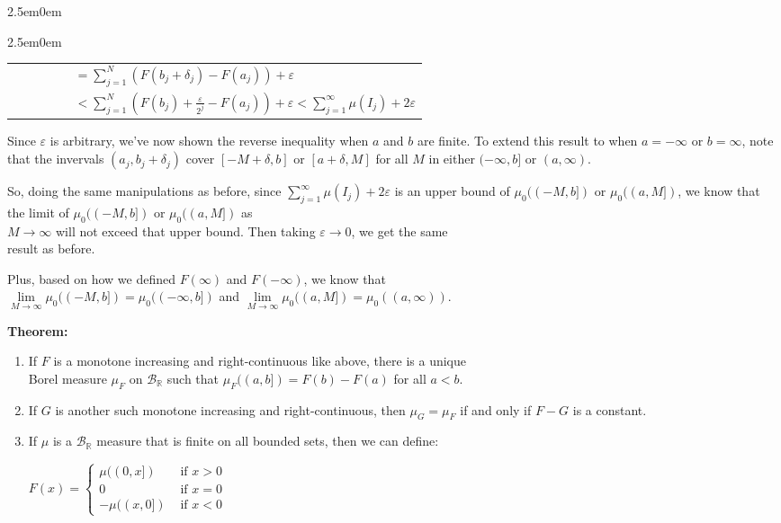 \documentclass{book}
\newenvironment{myIndent}{%
   \begin{adjustwidth}{2.5em}{0em}%
}{%
   \end{adjustwidth}%
}
\newcommand{\blab}[1]{\textbf{#1}}
\newcommand{\retTwo}{\hfill\bigbreak}
\begin{document}
\begin{myIndent}
\begin{myIndent}
{\begin{tabular}{l}
         $\phantom{\mu_0((a, b])} = \sum\limits_{j=1}^N (F(b_j + \delta_j) - F(a_j)) + \varepsilon$\\ [14pt]
         
         $\phantom{\mu_0((a, b])} < \sum\limits_{j=1}^N(F(b_j) + \frac{\varepsilon}{2^j} - F(a_j)) + \varepsilon < \sum\limits_{j=1}^\infty \mu(I_j) + 2\varepsilon$
      \end{tabular} \retTwo\par}

      Since $\varepsilon$ is arbitrary, we've now shown the reverse inequality when $a$ and $b$ are finite. To extend this result to when $a = -\infty$ or $b = \infty$, note that the invervals $(a_j, b_j + \delta_j)$ cover $[-M  + \delta, b]$ or $[a + \delta, M]$ for all $M$ in either $(-\infty, b]$ or $(a , \infty)$.\retTwo
      
      So, doing the same manipulations as before, since $\sum\limits_{j=1}^\infty \mu(I_j) + 2\varepsilon$ is an upper bound of $\mu_0((-M, b])$ or $\mu_0((a, M])$, we know that the limit of $\mu_0((-M, b])$ or $\mu_0((a, M])$ as\\ [6pt] $M \rightarrow \infty$ will not exceed that upper bound. Then taking $\varepsilon \rightarrow 0$, we get the same\\ [6pt] result as before.\retTwo

      Plus, based on how we defined $F(\infty)$ and $F(-\infty)$, we know that\\ $\lim\limits_{M \rightarrow \infty}\mu_0((-M, b]) = \mu_0((-\infty, b])$ and $\lim\limits_{M \rightarrow \infty}\mu_0((a, M]) = \mu_0((a, \infty))$.\retTwo
      \end{myIndent}

   \blab{Theorem:} 
   \begin{enumerate}
      \item If $F$ is a monotone increasing and right-continuous like above, there is a unique\\ Borel measure $\mu_F$ on $\mathcal{B}_\mathbb{R}$ such that $\mu_F((a, b]) = F(b) - F(a)$ for all $a < b$.
      \item If $G$ is another such monotone increasing and right-continuous, then $\mu_G = \mu_F$ if and only if $F - G$ is a constant.
      \item If $\mu$ is a $\mathcal{B}_{\mathbb{R}}$ measure that is finite on all bounded sets, then we can define:
      
      {\centering $F(x) = \left\{
      \begin{matrix}
         \mu((0, x]) & \text{ if } x > 0 \\
         0 & \text{ if } x = 0 \\
         -\mu((x, 0]) & \text{ if } x < 0
      \end{matrix}\right.$ \retTwo\par}


\end{enumerate}
\end{myIndent}
\end{document}
